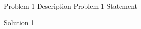 \documentclass{esg8022pset}
\begin{document}
\begin{problem}{Problem 1 Description}
  Problem 1 Statement
\end{problem}
\begin{solution}
  Solution 1
\end{solution}
\end{document}
